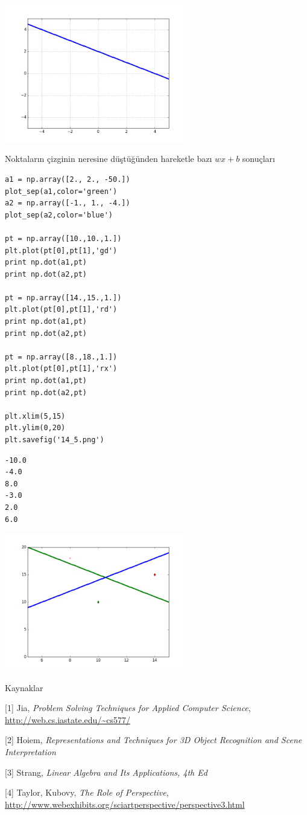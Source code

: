 \documentclass[12pt,fleqn]{article}\usepackage{../../common}
\begin{document}
\includegraphics[height=6cm]{vision_40lines_03.png}

Noktaların çizginin neresine düştüğünden hareketle bazı $wx + b$ sonuçları

\begin{verbatim}
a1 = np.array([2., 2., -50.])
plot_sep(a1,color='green')
a2 = np.array([-1., 1., -4.])
plot_sep(a2,color='blue')

pt = np.array([10.,10.,1.])
plt.plot(pt[0],pt[1],'gd')
print np.dot(a1,pt)
print np.dot(a2,pt)

pt = np.array([14.,15.,1.])
plt.plot(pt[0],pt[1],'rd')
print np.dot(a1,pt)
print np.dot(a2,pt)

pt = np.array([8.,18.,1.])
plt.plot(pt[0],pt[1],'rx')
print np.dot(a1,pt)
print np.dot(a2,pt)

plt.xlim(5,15)
plt.ylim(0,20)
plt.savefig('14_5.png')
\end{verbatim}

\begin{verbatim}
-10.0
-4.0
8.0
-3.0
2.0
6.0
\end{verbatim}

\includegraphics[height=6cm]{vision_40lines_04.png}

Kaynaklar 

[1] Jia, {\em Problem Solving Techniques for Applied Computer Science},
    \url{http://web.cs.iastate.edu/~cs577/}

[2] Hoiem, {\em Representations and Techniques for 3D Object Recognition and Scene Interpretation}

[3] Strang, {\em Linear Algebra and Its Applications, 4th Ed}

[4] Taylor, Kubovy, {\em The Role of Perspective}, \url{http://www.webexhibits.org/sciartperspective/perspective3.html}
\end{document}
